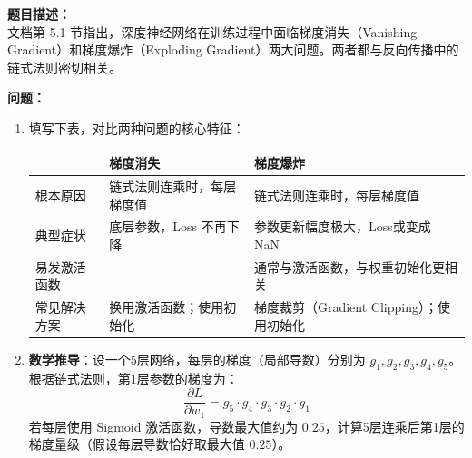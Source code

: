 \documentclass[a4paper,11pt]{ctexart}
\begin{document}
\begin{problembox}
    \textbf{题目描述：}\\
    文档第 5.1 节指出，深度神经网络在训练过程中面临梯度消失（Vanishing Gradient）和梯度爆炸（Exploding Gradient）两大问题。两者都与反向传播中的链式法则密切相关。

    \vspace{0.3cm}
    \textbf{问题：}
    \begin{enumerate}[(1)]
        \item 填写下表，对比两种问题的核心特征：

        \begin{center}
        \begin{tabular}{p{2.5cm} p{4.5cm} p{4.5cm}}
            \toprule
            & \textbf{梯度消失} & \textbf{梯度爆炸} \\
            \midrule
            根本原因 & 链式法则连乘时，每层梯度值\underline{\hspace{1.5cm}} & 链式法则连乘时，每层梯度值\underline{\hspace{1.5cm}} \\[1.5em]
            典型症状 & 底层参数\underline{\hspace{2.0cm}}，Loss 不再下降 & 参数更新幅度极大，Loss\underline{\hspace{1.5cm}}或变成 NaN \\[1.5em]
            易发激活函数 & \underline{\hspace{3.0cm}} & 通常与激活函数\underline{\hspace{1.5cm}}，与权重初始化更相关 \\[1.5em]
            常见解决方案 & 换用\underline{\hspace{1.5cm}}激活函数；使用\underline{\hspace{1.5cm}}初始化 & 梯度裁剪（Gradient Clipping）；使用\underline{\hspace{1.5cm}}初始化 \\
            \bottomrule
        \end{tabular}
        \end{center}

        \item \textbf{数学推导}：设一个5层网络，每层的梯度（局部导数）分别为 $g_1, g_2, g_3, g_4, g_5$。根据链式法则，第1层参数的梯度为：
        \[
        \frac{\partial L}{\partial w_1} = g_5 \cdot g_4 \cdot g_3 \cdot g_2 \cdot g_1
        \]
        若每层使用 Sigmoid 激活函数，导数最大值约为 $0.25$，计算5层连乘后第1层的梯度量级（假设每层导数恰好取最大值 $0.25$）。


\end{enumerate}
\end{problembox}
\end{document}
